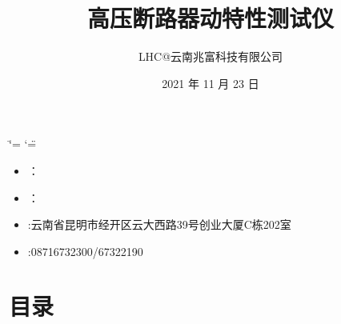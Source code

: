 \documentclass[a4paper,10pt,english]{sphinxmanual}
\title{高压断路器动特性测试仪}
\date{2021 年 11 月 23 日}
\author{LHC@云南兆富科技有限公司}
\begin{document}
\ifdefined\shorthandoff
  \ifnum\catcode`\=\string=\active\shorthandoff{=}\fi
  \ifnum\catcode`\"=\active{}\fi
\fi

\pagestyle{empty}
\sphinxmaketitle
\pagestyle{plain}
\sphinxtableofcontents
\pagestyle{normal}
\label{\detokenize{index::doc}}


\begin{figure}[htbp]
\centering

\noindent{}
\end{figure}
\begin{itemize}
\item {} 
\sphinxAtStartPar
{}：

\item {} 
\sphinxAtStartPar
{}：

\item {} 
\sphinxAtStartPar
{}:云南省昆明市经开区云大西路39号创业大厦C栋202室

\item {} 
\sphinxAtStartPar
{}:0871\sphinxhyphen{}6732300/67322190

\end{itemize}


\chapter{目录}
\label{\detokenize{index:id2}}
\end{document}
